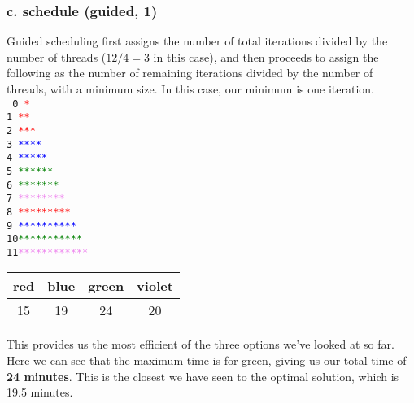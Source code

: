 \documentclass[titlepage]{article}
\def\code#1{\texttt{#1}}
\begin{document}
\subsubsection*{c. schedule (guided, 1)}
Guided scheduling first assigns the number of total iterations divided by
the number of threads ($12/4 = 3$ in this case), and then proceeds to assign
the following as the number of remaining iterations divided by the number
of threads, with a minimum size. In this case, our minimum is one iteration.\\
\code{
0 \textcolor{red}   {*}\\
1 \textcolor{red}   {**}\\
2 \textcolor{red}   {***}\\
3 \textcolor{blue}  {****}\\
4 \textcolor{blue}  {*****}\\
5 \textcolor{green} {******}\\
6 \textcolor{green} {*******}\\
7 \textcolor{violet}{********}\\
8 \textcolor{red}   {*********}\\
9 \textcolor{blue}  {**********}\\
10\textcolor{green} {***********}\\
11\textcolor{violet}{************}
}
\begin{center}
    \begin{tabular}{|c|c|c|c|}
        \hline
        red&blue&green&violet \\
        \hline
        15 & 19 & 24 & 20 \\
        \hline
    \end{tabular}
\end{center}
This provides us the most efficient of the three options we've looked at so
far. Here we can see that the maximum time is for green, giving us our
total time of \textbf{24 minutes}. This is the closest we have seen to the
optimal solution, which is 19.5 minutes.
\end{document}
